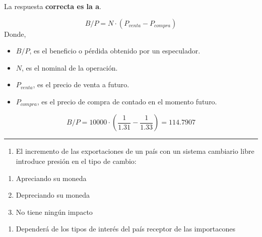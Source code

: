 \documentclass[
  letterpaper,
  DIV=11,
  numbers=noendperiod]{scrreprt}
\providecommand{\tightlist}{%
  \setlength{\itemsep}{0pt}\setlength{\parskip}{0pt}}\usepackage{longtable,booktabs,array}
\begin{document}
\begin{tcolorbox}[enhanced jigsaw, left=2mm, opacityback=0, colback=white, breakable, arc=.35mm, bottomrule=.15mm, rightrule=.15mm, toprule=.15mm, leftrule=.75mm, colframe=quarto-callout-tip-color-frame]
\begin{minipage}[t]{5.5mm}
\textcolor{quarto-callout-tip-color}{\faLightbulb}
\end{minipage}%
\begin{minipage}[t]{\textwidth - 5.5mm}

La respuesta \textbf{correcta es la a}.

\[B/P=N\cdot (P_{venta}-P_{compra})\] Donde,

\begin{itemize}
\item
  \(B/P\), es el beneficio o pérdida obtenido por un especulador.
\item
  \(N\), es el nominal de la operación.
\item
  \(P_{venta}\), es el precio de venta a futuro.
\item
  \(P_{compra}\), es el precio de compra de contado en el momento
  futuro.
\end{itemize}

\[B/P=10000\cdot\left(\frac{1}{1.31}-\frac{1}{1.33}\right)=114.7907\]

\end{minipage}%
\end{tcolorbox}

\begin{center}\rule{0.5\linewidth}{0.5pt}\end{center}

\begin{enumerate}
\def\labelenumi{\arabic{enumi}.}
\setcounter{enumi}{10}
\tightlist
\item
  El incremento de las exportaciones de un país con un sistema cambiario
  libre introduce presión en el tipo de cambio:
\end{enumerate}

\begin{enumerate}
\def\labelenumi{\alph{enumi})}
\item
  Apreciando su moneda
\item
  Depreciando su moneda
\item
  No tiene ningún impacto
\end{enumerate}

\begin{enumerate}
\def\labelenumi{\Alph{enumi})}
\setcounter{enumi}{3}
\tightlist
\item
  Dependerá de los tipos de interés del país receptor de las
  importacones
\end{enumerate}
\end{document}
